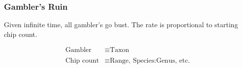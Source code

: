 \documentclass{beamer}
\begin{document}
\begin{frame}
  \frametitle{Gambler's Ruin}

  \begin{definition}
    Given infinite time, all gambler's go bust. The rate is proportional to starting chip count.
  \end{definition}

  \bigskip

  \begin{center}
    \begin{align*}
      \text{Gambler} &\equiv \text{Taxon} \\
      \\
      \text{Chip count} &\equiv \text{Range, Species:Genus, etc.}
    \end{align*}
  \end{center}
  
\end{frame}












\end{document}
